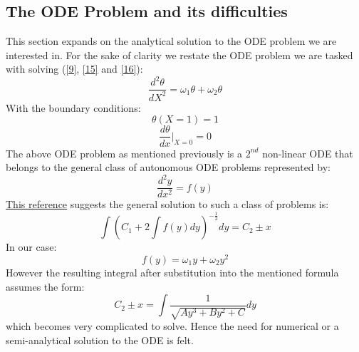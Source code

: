 \documentclass[12pt]{article}
\begin{document}
\subsection{The ODE Problem and its difficulties}
This section expands on the analytical solution to the ODE problem we are interested in. For the sake of clarity we restate the ODE problem we are tasked with solving (\eqref{9}, \eqref{15} and \eqref{16}):
\[  
\frac{d^2\theta}{dX^2} = \omega_1 \theta + \omega_2 \theta \tag{9} 
\]
With the boundary conditions:
\[
\theta (X=1) = 1 \tag{15} 
\]
\[
\frac{d\theta}{dx}\Bigr|_{X=0} = 0 \tag{16} 
\]
The above ODE problem as mentioned previously is a $2^{nd}$ non-linear ODE that belongs to the general class of autonomous ODE problems represented by:
\[
\frac{d^2y}{dx^2} = f(y) \tag{17} \label{17}
\]
\href{http://eqworld.ipmnet.ru/en/solutions/ode/ode0301.pdf}{This reference} suggests the general solution to such a class of problems is: 
\[
\int \left(C_1 + 2\int f(y)dy\right)^{-\frac{1}{2}}dy = C_2 \pm x \tag{18} \label{18}
\]
In our case:
\[
f(y) = \omega_1 y + \omega_2 y^2 \tag{19} \label{19}
\]
However the resulting integral after substitution into the mentioned formula assumes the form: 
\[
C_2 \pm x = \int \frac{1}{\sqrt{Ay^3 + By^2 + C}} dy \tag{20} \label{20} 
\]
which becomes very complicated to solve. Hence the need for numerical or a semi-analytical solution to the ODE is felt.
\end{document}
